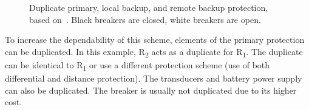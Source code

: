 \begin{figure}
    \centering
     \\  \baselineskip
     \\  \baselineskip
    \caption{Duplicate primary, local backup, and remote backup protection, based on~\cite{HorowitzBook}. Black breakers are closed, white breakers are open.}
    \label{fig:fault_clearing}
\end{figure}

To increase the dependability of this scheme, elements of the primary protection can be duplicated. In this example, R\textsubscript{2} acts as a duplicate for R\textsubscript{1}. The duplicate can be identical to R\textsubscript{1} or use a different protection scheme (\eg use of both differential and distance protection). The transducers and battery power supply can also be duplicated. The breaker is usually not duplicated due to its higher cost.

